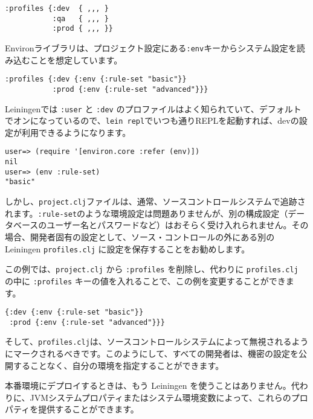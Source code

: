 \begin{lstlisting}[numbers=none]
:profiles {:dev  { ,,, }
           :qa   { ,,, }
           :prod { ,,, }}
\end{lstlisting}

Environライブラリは、プロジェクト設定にある\texttt{:env}キーからシステム設定を読み込むことを想定しています。

\begin{lstlisting}[numbers=none]
:profiles {:dev {:env {:rule-set "basic"}}
           :prod {:env {:rule-set "advanced"}}}
\end{lstlisting}

Leiningenでは \texttt{:user} と \texttt{:dev} のプロファイルはよく知られていて、デフォルトでオンになっているので、\texttt{lein repl}でいつも通りREPLを起動すれば、devの設定が利用できるようになります。

\begin{lstlisting}[numbers=none]
user=> (require '[environ.core :refer (env)])
nil
user=> (env :rule-set)
"basic"
\end{lstlisting}

しかし、\texttt{project.clj}ファイルは、通常、ソースコントロールシステムで追跡されます。\texttt{:rule-set}のような環境設定は問題ありませんが、別の構成設定（データベースのユーザー名とパスワードなど）はおそらく受け入れられません。その場合、開発者固有の設定として、ソース・コントロールの外にある別の Leiningen \texttt{profiles.clj} に設定を保存することをお勧めします。

この例では、\texttt{project.clj} から \texttt{:profiles} を削除し、代わりに \texttt{profiles.clj} の中に \texttt{:profiles} キーの値を入れることで、この例を変更することができます。


\begin{lstlisting}[numbers=none]
{:dev {:env {:rule-set "basic"}}
 :prod {:env {:rule-set "advanced"}}}
\end{lstlisting}

そして、\texttt{profiles.clj}は、ソースコントロールシステムによって無視されるようにマークされるべきです。このようにして、すべての開発者は、機密の設定を公開することなく、自分の環境を指定することができます。

本番環境にデプロイするときは、もう Leiningen を使うことはありません。代わりに、JVMシステムプロパティまたはシステム環境変数によって、これらのプロパティを提供することができます。

